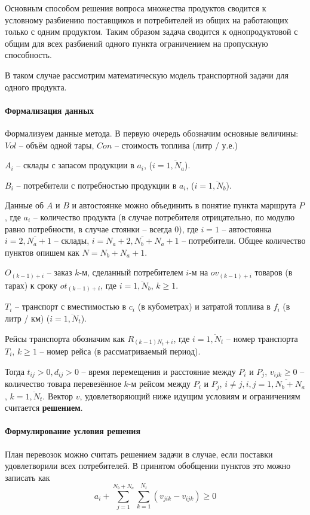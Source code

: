 	Основным способом решения вопроса множества продуктов сводится к условному разбиению поставщиков и потребителей из общих на работающих только с одним продуктом. Таким образом задача сводится к однопродуктовой с общим для всех разбиений одного пункта ограничением на пропускную способность.
	
	В таком случае рассмотрим математическую модель транспортной задачи для одного продукта.
	\paragraph{Формализация данных}
	Формализуем данные метода. В первую очередь обозначим основные величины: $Vol$ -- объём одной тары, $Con$ -- стоимость топлива (литр / у.е.)
	
	$A_i$ -- склады с запасом продукции в $a_i$, ($i = \overline{1, N_a}$).
	
	$B_i$ -- потребители с потребностью продукции в $a_i$, ($i = \overline{1, N_b}$).
	
	Данные об $A$ и $B$ и автостоянке можно объединить в понятие пункта маршрута $P$, где $a_i$ -- количество продукта (в случае потребителя отрицательно, по модулю равно потребности, в случае стоянки -- всегда 0), где $i = 1$ -- автостоянка $i = \overline{2, N_a + 1}$ -- склады, $i = \overline{N_a+2, N_b+N_a+1}$ -- потребители. Общее количество пунктов опишем как $N = N_b+N_a+1$.
	
	$O_{(k-1) + i}$ -- заказ $k$-м, сделанный потребителем $i$-м на $ov_{(k-1) + i}$ товаров (в тарах) к сроку $ot_{(k-1) + i}$, где $i = \overline{1, N_b}$, $k \ge 1$.
		
	$T_i$ -- транспорт с вместимостью в $c_i$ (в кубометрах) и затратой топлива в $f_i$ (в литр / км) ($i = \overline{1, N_t}$). 
	
	Рейсы транспорта обозначим как $R_{(k-1)N_t + i}$, где $i = \overline{1, N_t}$ -- номер транспорта $T_i$, $k \ge 1$ -- номер рейса (в рассматриваемый период).
	
	Тогда $t_{ij} > 0, d_{ij} > 0$ -- время перемещения и расстояние между $P_i$ и $P_j$, $v_{ijk} \ge 0$ -- количество товара перевезённое $k$-м рейсом между $P_i$ и $P_j$, $i \ne j, i, j = \overline{1, N_b+N_a}$, $k = \overline{1, N_t}$. Вектор $v$, удовлетворяющий ниже идущим условиям и ограничениям считается \textbf{решением}.
	
	\paragraph{Формулирование условия решения}    
	План перевозок можно считать решением задачи в случае, если поставки удовлетворили всех потребителей. В принятом обобщении пунктов это можно записать как
	\begin{equation}
		a_i + \sum_{j=1}^{N_b+N_a} \sum_{k=1}^{N_t} (v_{jik} - v_{ijk}) \ge 0
	\end{equation}
	
